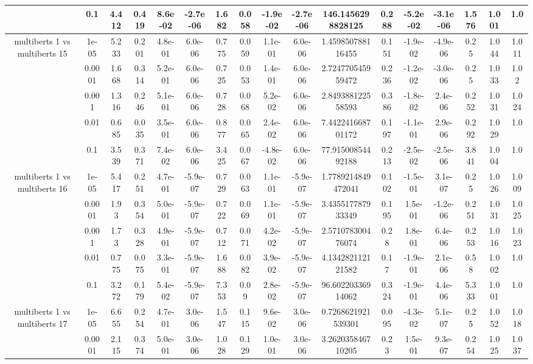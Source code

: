 \begin{tabular}{|c|c|c|c|c|c|c|c|c|c|c|c|c|c|c|c|c|}
 & 0.1 & 4.412 & 0.419 & 8.6e-02 & -2.7e-06 & 1.682 & 0.058 & -1.9e-02 & -2.7e-06 & 146.1456298828125 & 0.288 & -5.2e-02 & -3.1e-06 & 1.576 & 1.001 & 1.0 \\
\hline
\multirow{5}{*}{multiberts 1 vs multiberts 15} & 1e-05 & 5.233 & 0.201 & 4.8e-01 & 6.0e-06 & 0.775 & 0.059 & 1.1e-01 & 6.0e-06 & 1.459850788116455 & 0.151 & -1.9e-02 & -4.9e-06 & 0.25 & 1.044 & 1.011 \\
 & 0.0001 & 1.668 & 0.314 & 5.2e-01 & 6.0e-06 & 0.725 & 0.053 & 1.4e-01 & 6.0e-06 & 2.724770545959472 & 0.236 & -1.2e-02 & -3.0e-06 & 0.25 & 1.033 & 1.02 \\
 & 0.001 & 1.316 & 0.246 & 5.1e-01 & 6.0e-06 & 0.728 & 0.068 & 5.2e-02 & 6.0e-06 & 2.849388122558593 & 0.386 & -1.8e-02 & 2.4e-06 & 0.252 & 1.031 & 1.024 \\
 & 0.01 & 0.685 & 0.035 & 3.5e-01 & 6.0e-06 & 0.877 & 0.065 & 2.4e-02 & 6.0e-06 & 7.442241668701172 & 0.197 & -1.1e-01 & 2.9e-06 & 0.292 & 1.029 & 1.0 \\
 & 0.1 & 3.539 & 0.371 & 7.4e-02 & 6.0e-06 & 3.425 & 0.067 & -4.8e-02 & 6.0e-06 & 77.91500854492188 & 0.213 & -2.5e-02 & -2.5e-06 & 3.841 & 1.004 & 1.0 \\
\hline
\multirow{5}{*}{multiberts 1 vs multiberts 16} & 1e-05 & 5.417 & 0.251 & 4.7e-01 & -5.9e-07 & 0.729 & 0.063 & 1.1e-01 & -5.9e-07 & 1.7789214849472041 & 0.102 & -1.5e-01 & 3.1e-07 & 0.25 & 1.026 & 1.009 \\
 & 0.0001 & 1.93 & 0.354 & 5.0e-01 & -5.9e-07 & 0.722 & 0.069 & 1.1e-01 & -5.9e-07 & 3.435517787933349 & 0.195 & 1.5e-01 & -1.2e-06 & 0.251 & 1.031 & 1.025 \\
 & 0.001 & 1.73 & 0.328 & 4.9e-01 & -5.9e-07 & 0.712 & 0.071 & 4.2e-02 & -5.9e-07 & 2.571078300476074 & 0.28 & 1.8e-01 & 6.4e-06 & 0.253 & 1.016 & 1.023 \\
 & 0.01 & 0.775 & 0.075 & 3.3e-01 & -5.9e-07 & 1.688 & 0.082 & 3.9e-02 & -5.9e-07 & 4.134282112121582 & 0.17 & -1.9e-01 & 2.1e-06 & 0.58 & 1.002 & 1.0 \\
 & 0.1 & 3.272 & 0.179 & 5.4e-02 & -5.9e-07 & 7.353 & 0.09 & 2.8e-02 & -5.9e-07 & 96.60220336914062 & 0.324 & -1.9e-01 & 4.4e-06 & 5.333 & 1.001 & 1.0 \\
\hline
\multirow{5}{*}{multiberts 1 vs multiberts 17} & 1e-05 & 6.655 & 0.254 & 4.7e-01 & 3.0e-06 & 1.547 & 0.115 & 9.6e-02 & 3.0e-06 & 0.7268621921539301 & 0.095 & -4.3e-02 & 5.1e-07 & 0.25 & 1.052 & 1.018 \\
 & 0.0001 & 2.115 & 0.374 & 5.0e-01 & 3.0e-06 & 1.028 & 0.129 & 1.0e-01 & 3.0e-06 & 3.262035846710205 & 0.23 & 1.5e-01 & 9.3e-07 & 0.254 & 1.025 & 1.037 \\

\end{tabular}
